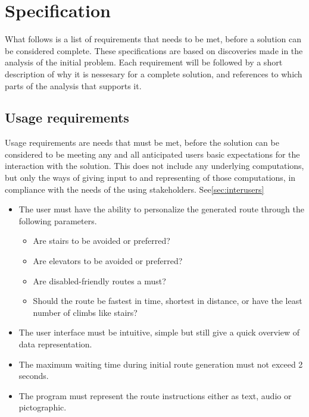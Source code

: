 \section{Specification} %
\label{sec:specification}

What follows is a list of requirements that needs to be met, before a solution can be considered complete. These specifications are based on discoveries made in the analysis of the initial problem. Each requirement will be followed by a short description of why it is nessesary for a complete solution, and references to which parts of the analysis that supports it.

\subsection{Usage requirements}

Usage requirements are needs that must be met, before the solution can be considered to be meeting any and all anticipated users basic expectations for the interaction with the solution. This does not include any underlying computations, but only the ways of giving input to and representing of those computations, in compliance with the needs of the using stakeholders. See\cref{sec:interusers} 

\begin{itemize}
	\item The user must have the ability to personalize the generated route through the following parameters.
			\begin{itemize}
				\item Are stairs to be avoided or preferred?
				\item Are elevators to be avoided or preferred?
				\item Are disabled-friendly routes a must?
				\item Should the route be fastest in time, shortest in distance, or have the least number of climbs like stairs?
			\end{itemize}

	\item The user interface must be intuitive, simple but still give a quick overview of data representation.
	\item The maximum waiting time during initial route generation must not exceed 2 seconds.
	\item The program must represent the route instructions either as text, audio or pictographic.
\end{itemize}


